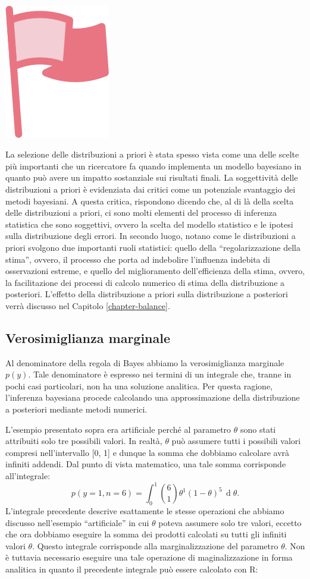 \documentclass[
  10pt,
  italian,
  a4paper,
  extrafontsizes,onecolumn,openright
  ]{memoir}
\newcommand{\R}{\textsf{R}} %
\newenvironment{mdframedwithfootImportant}
{   
    \savenotes
    \begin{mdframed}[%
    topline=true, bottomline=true, linecolor=oiR, linewidth=0.5pt,
    rightline=false, leftline=false,
    backgroundcolor=oiLGray]
    \renewcommand{\thempfootnote}{\arabic{footnote}}
    }
{
    \end{mdframed}
    \spewnotes
}
\newenvironment{important}{
    \let\oldtextbf\textbf
    \renewcommand{\textbf}[1]{{\textcolor{oiR}{\oldtextbf{##1}}}}
\vspace{4mm}
\begin{mdframedwithfootImportant}
\begin{minipage}[t]{0.10\textwidth}
{$\:$ \\ \setkeys{Gin}{width=2.5em,keepaspectratio}\includegraphics{images/_icons/important.png}}
\end{minipage}
\hfill
\begin{minipage}[t]{0.90\textwidth}
\vspace{-2mm}
\setlength{\parskip}{1em}
}{\end{minipage}
\end{mdframedwithfootImportant}
\vspace{4mm}
}
\begin{document}
\begin{important}
La selezione delle distribuzioni a priori è stata spesso vista come una delle scelte più importanti che un ricercatore fa quando implementa un modello bayesiano in quanto può avere un impatto sostanziale sui risultati finali. La soggettività delle distribuzioni a priori è evidenziata dai critici come un potenziale svantaggio dei metodi bayesiani. A questa critica, \textcite{vandeSchoot2021modelling} rispondono dicendo che, al di là della scelta delle distribuzioni a priori, ci sono molti elementi del processo di inferenza statistica che sono soggettivi, ovvero la scelta del modello statistico e le ipotesi sulla distribuzione degli errori. In secondo luogo, \textcite{vandeSchoot2021modelling} notano come le distribuzioni a priori svolgono due importanti ruoli statistici: quello della ``regolarizzazione della stima'', ovvero, il processo che porta ad indebolire l'influenza indebita di osservazioni estreme, e quello del miglioramento dell'efficienza della stima, ovvero, la facilitazione dei processi di calcolo numerico di stima della distribuzione a posteriori. L'effetto della distribuzione a priori sulla distribuzione a posteriori verrà discusso nel Capitolo \ref{chapter-balance}.

\end{important}

\hypertarget{verosim-marginale}{%
\subsection{Verosimiglianza marginale}\label{verosim-marginale}}

Al denominatore della regola di Bayes abbiamo la verosimiglianza marginale \(p(y)\). Tale denominatore è espresso nei termini di un integrale che, tranne in pochi casi particolari, non ha una soluzione analitica. Per questa ragione, l'inferenza bayesiana procede calcolando una approssimazione della distribuzione a posteriori mediante metodi numerici.

L'esempio presentato sopra era artificiale perché al parametro \(\theta\) sono stati attribuiti solo tre possibili valori. In realtà, \(\theta\) può assumere tutti i possibili valori compresi nell'intervallo {[}0, 1{]} e dunque la somma che dobbiamo calcolare avrà infiniti addendi. Dal punto di vista matematico, una tale somma corrisponde all'integrale:
\[
p(y = 1, n = 6) = \int_0^1 \binom{6}{1} \theta^{1} (1-\theta)^{5} \,\operatorname {d}\!\theta.
\]
\noindent
L'integrale precedente descrive esattamente le stesse operazioni che abbiamo discusso nell'esempio ``artificiale'' in cui \(\theta\) poteva assumere solo tre valori, eccetto che ora dobbiamo eseguire la somma dei prodotti calcolati su tutti gli infiniti valori \(\theta\). Questo integrale corrisponde alla marginalizzazione del parametro \(\theta\). Non è tuttavia necessario eseguire una tale operazione di maginalizzazione in forma analitica in quanto il precedente integrale può essere calcolato con \R:
\end{document}
